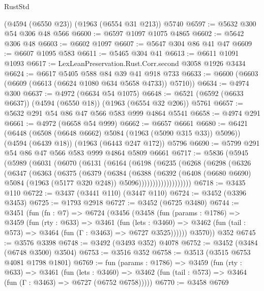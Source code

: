 \begin{lexlean}{RustStd}
\begin{coremodule}
    (@4594 (@6550 @23))
    (@1963 (@6554 @31 @213))
    @5740
@6597 := @5632 @300 @54 @306 @48 @566
@6600 := @6597 @1097 @1075 @4865
@6602 := @5642 @306 @48
@6603 := @6602 @1097
@6607 := @5647 @304 @86 @41 @47
@6609 := @6607 @1095 @583
@6611 := @5465 @304 @41
@6613 := @6611 @1091 @1093
@6617 := LexLeanPreservation.Rust.Corr.second @3058 @1926 @3434
@6624 := @6617 @5405 @588 @84 @39 @41 @918 @733
@6633 := @6600 (@6603 (@6609 (@6613 (@6624 @1080 @634 @5658 @4733)) @5710))
@6634 := @4974 @300
@6637 := @4972 (@6634 @54 @1075)
@6648 := @6521 (@6592 (@6633 @6637)) (@4594 (@6550 @18)) (@1963 (@6554 @32 @206)) @5761
@6657 := @5632 @291 @54 @86 @47 @566 @583 @999 @4864 @5541
@6658 := @4974 @291
@6661 := @4972 (@6658 @54 @999)
@6662 := @6657 @6661
@6680 := @6421
    (@6448 (@6508 (@6648 @6662) @5084 (@1963 (@5090 @315 @33)) @5096))
    (@4594 (@6439 @18))
    (@1963 (@6443 @247 @172))
    @5796
@6690 := @5799 @291 @54 @86 @47 @566 @583 @999 @4864 @5809 @6661
@6717 := @5836
    (@5945
      (@5989
        (@6031
          (@6070
            (@6131
              (@6164
                (@6198
                  (@6235
                    (@6268
                      (@6298
                        (@6326
                          (@6347
                            (@6363
                              (@6375
                                (@6379
                                  (@6384
                                    (@6388
                                      (@6392
                                        (@6408
                                          (@6680 @6690)
                                          @5084
                                          (@1963 (@5177 @320 @248))
                                          @5096)))))))))))))))))))
@6718 := @3435 @110
@6722 := @3437 (@3441 @110) (@3447 @110)
@6724 := @3452 (@3396 @3453)
@6725 := @1793 @2918
@6727 := @3452 (@6725 @3480)
@6744 := @3451
    (fun (fn : @7) =>
    @6724
      (@3456
        (@3458
          (fun (params : @1786) =>
          @3459
            (fun (rty : @633) =>
            @3461
              (fun (lets : @3460) =>
              @3462 (fun (tail : @573) => @3464 (fun (Γ : @3463) => @6727 @3525))))))
        @3570))
    @352
@6745 := @3576 @3398
@6748 := @3492 (@3493 @352) @4078
@6752 := @3452 (@3484 (@6748 @3500) @3504)
@6753 := @3516 @352
@6758 := @3513 (@3515 @6753 @4081 @1798 @1801)
@6769 := fun (params : @1786) =>
  @3459
    (fun (rty : @633) =>
    @3461
      (fun (lets : @3460) =>
      @3462 (fun (tail : @573) => @3464 (fun (Γ : @3463) => @6727 (@6752 @6758)))))
@6770 := @3458 @6769

\end{coremodule}
\end{lexlean}
